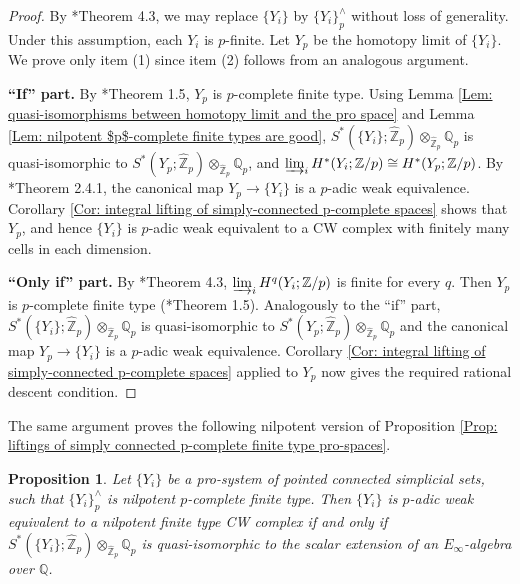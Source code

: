 \documentclass[11pt]{amsart}
\newtheorem{proposition}[theorem]{Proposition}
\theoremstyle{definition}
\numberwithin{equation}{section}
\numberwithin{equation}{section}
\newcommand\QQ{\mathbb{Q}}
\newcommand\ZZ{\mathbb{Z}}
\begin{document}
\begin{proof}
By \cite{Artin-Mazur-etale-homotopy}*{Theorem 4.3}, we may replace $\{Y_i\}$ by $\{Y_i\}^{\wedge}_p$ without loss of generality. Under this assumption, each $Y_i$ is $p$-finite. Let $Y_p$ be the homotopy limit of $\{Y_i\}$. We prove  only item (1) since item (2) follows from an analogous argument.

\textbf{``If'' part.}  
By \cite{Hu-Zhang-formal-manifold-structures}*{Theorem 1.5}, $Y_p$ is $p$-complete finite type. Using Lemma \ref{Lem: quasi-isomorphisms between homotopy limit and the pro space} and Lemma \ref{Lem: nilpotent $p$-complete finite types are good}, $S^*(\{Y_i\};\widehat{\ZZ}_p)\otimes_{\widehat{\ZZ}_p} \QQ_p$ is quasi-isomorphic to $S^*(Y_p;\widehat{\ZZ}_p)\otimes_{\widehat{\ZZ}_p} \QQ_p$, and $\varinjlim_i H^*(Y_i;\ZZ/p)\cong H^*(Y_p;\ZZ/p)$. By \cite{Morel-p-adic-spaces}*{Theorem 2.4.1}, the canonical map $Y_p\rightarrow \{Y_i\}$ is a $p$-adic weak equivalence. Corollary \ref{Cor: integral lifting of simply-connected p-complete spaces} shows that $Y_p$, and hence $\{Y_i\}$ is $p$-adic weak equivalent to a CW complex with finitely many cells in each dimension.

\textbf{``Only if'' part.}
By \cite{Artin-Mazur-etale-homotopy}*{Theorem 4.3}, $\varinjlim_i H^q(Y_i;\ZZ/p)$ is finite for every $q$. Then $Y_p$ is $p$-complete finite type (\cite{Hu-Zhang-formal-manifold-structures}*{Theorem 1.5}). Analogously to the ``if'' part, $S^*(\{Y_i\};\widehat{\ZZ}_p)\otimes_{\widehat{\ZZ}_p} \QQ_p$ is quasi-isomorphic to $S^*(Y_p;\widehat{\ZZ}_p)\otimes_{\widehat{\ZZ}_p} \QQ_p$ and the canonical map $Y_p\rightarrow \{Y_i\}$ is a $p$-adic weak equivalence. Corollary \ref{Cor: integral lifting of simply-connected p-complete spaces} applied to $Y_p$ now gives the required rational descent condition.
\end{proof}

The same argument proves the following nilpotent version of Proposition \ref{Prop: liftings of simply connected p-complete finite type pro-spaces}.

\begin{proposition}\label{Prop: liftings of nilpotent p-complete finite type pro-spaces}
Let $\{Y_i\}$ be a pro-system of pointed connected simplicial sets, such that $\{Y_i\}^{\wedge}_p$ is nilpotent $p$-complete finite type. Then
$\{Y_i\}$ is $p$-adic weak equivalent to a nilpotent finite type CW complex if and only if  $S^*(\{Y_i\};\widehat{\ZZ}_p)\otimes_{\widehat{\ZZ}_p} \QQ_p$ is quasi-isomorphic to the scalar extension of an $E_{\infty}$-algebra over $\QQ$.
\end{proposition}
\end{document}
